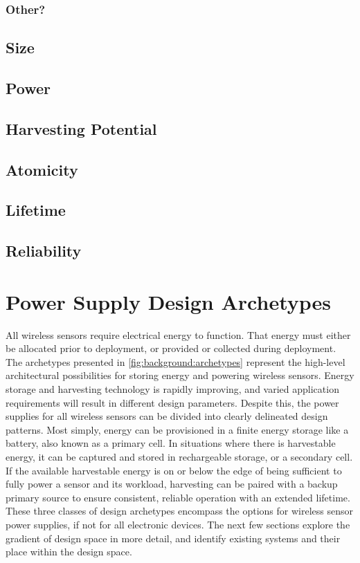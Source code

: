 \subsubsection{Other?}

\subsection{Size}

\subsection{Power}

\subsection{Harvesting Potential}

\subsection{Atomicity}

\subsection{Lifetime}

\subsection{Reliability}





\section{Power Supply Design Archetypes}

All wireless sensors require electrical energy to function.
That energy must either be allocated prior to deployment, or provided or collected during deployment.
The archetypes presented in \cref{fig:background:archetypes} represent the high-level architectural possibilities for storing energy and powering wireless sensors.
Energy storage and harvesting technology is rapidly improving, and varied application requirements will result in different design parameters. Despite this, the power supplies for all wireless sensors can be divided into clearly delineated design patterns.
Most simply, energy can be provisioned in a finite energy storage like a battery, also known as a primary cell. In situations where there is harvestable energy, it can be captured and stored in rechargeable storage, or a secondary cell.
If the available harvestable energy is on or below the edge of being sufficient to fully power a sensor and its workload, harvesting can be paired with a backup primary source to ensure consistent, reliable operation with an extended lifetime.
These three classes of design archetypes encompass the options for wireless sensor power supplies, if not for all electronic devices.
The next few sections explore the gradient of design space in more detail, and identify existing systems and their place within the design space.

